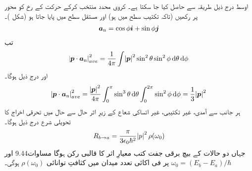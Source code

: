  اوسط درج ذیل طریقہ سے حاصل کیا جا سکتا ہے۔ کروی محدد منتخب کرکے حرکت کے رخ کو  محور پر رکھیں  (تاکہ تکتیب  سطح میں ہو)  اور مستقل   سطح  میں پایا جاتا ہو    (شکل )۔
\begin{align}
	{\ensuremath{{\boldsymbol{a}}}_{\textup{n}}} = \cos\phi{\boldsymbol{i}}+\sin\phi{\boldsymbol{j}}
\end{align}  
تب 
\begin{align*}
	\abs{\kvec{p}\cdot \kvecsub{a}{n}}^2_{ave} = \frac{1}{4\pi}\int\abs{\kvec{p}}^2\sin^2\theta\sin^2\phi \dif \theta \dif \phi
\end{align*}
اور درج ذیل ہوگا۔ 
\begin{align}
	\abs{\kvec{p}\cdot\kvecsub{a}{n}}^2_{ave} = \frac{\abs{\kvec{p}}^2}{4\pi}\int_0^{\pi}\sin^3\theta\dif\theta\int_0^{2\pi}\sin^2\phi\dif\phi = \frac{1}{3}\abs{\kvec{p}}^2
\end{align}
  ہر جانب سے آمدی، غیر تکتیبی، غیر اتساکی شعاع کے زیرِ اثر حال  سے حال  میں تحرقی اخراج کا تحویلی شرع درج ذیل ہوگا۔
\begin{align}
	R_{b\rightarrow a} = \frac{\pi}{3\epsilon_0\hbar^2}\abs{p}^2\rho(\omega_0)
\end{align}
جہاں دو حالات کے بیچ برقی جفت کتب معیارِ اثر کا قالبی رکن  ہوگا مساوات\num{9.44} اور \(\omega_0 = (E_b-E_a)/\hbar\) پر فی اکائی تعدد میدان میں کثافتِ توانائی \(\rho(\omega_0)\) ہوگی۔


